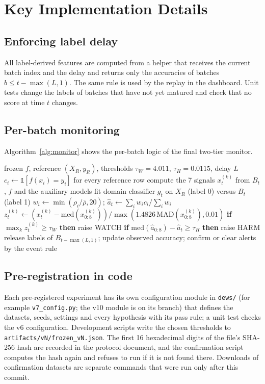\section{Key Implementation Details}
\subsection{Enforcing label delay}
All label-derived features are computed from a helper that receives the current batch index and the delay and returns only the accuracies of batches $b \le t-\max(L,1)$. The same rule is used by the replay in the dashboard. Unit tests change the labels of batches that have not yet matured and check that no score at time $t$ changes.

\subsection{Per-batch monitoring}
Algorithm~\ref{alg:monitor} shows the per-batch logic of the final two-tier monitor.

\begin{algorithm}[H]
\caption{Two-tier monitoring of one stream}
\label{alg:monitor}
\begin{algorithmic}[1]
\Require frozen $f$, reference $(X_R, y_R)$, thresholds $\tau_W=4.011$, $\tau_H=0.0115$, delay $L$
\State $c_i \gets \mathbb{1}[f(x_i)=y_i]$ for every reference row
  \State compute the 7 signals $x_t^{(k)}$ from $B_t$, $f$ and the auxiliary models
  \State fit domain classifier $g_t$ on $X_R$ (label 0) versus $B_t$ (label 1)
  \State $w_i \gets \min(\rho_i/\bar\rho, 20)$; \quad $\hat a_t \gets \sum_i w_i c_i / \sum_i w_i$
    \State $z^{(k)}_t \gets (x^{(k)}_t - \mathrm{med}(x^{(k)}_{0:8})) / \max(1.4826\,\mathrm{MAD}(x^{(k)}_{0:8}), 0.01)$
    \State \textbf{if} $\max_k z^{(k)}_t \geq \tau_W$ \textbf{then} raise WATCH
    \State \textbf{if} $\mathrm{med}(\hat a_{0:8}) - \hat a_t \geq \tau_H$ \textbf{then} raise HARM
  \EndIf
  \State release labels of $B_{t-\max(L,1)}$; update observed accuracy; confirm or clear alerts by the event rule
\EndFor
\end{algorithmic}
\end{algorithm}

\subsection{Pre-registration in code}
Each pre-registered experiment has its own configuration module in \texttt{dews/} (for example \texttt{v7\_config.py}; the v10 module is on its branch) that defines the datasets, seeds, settings and every hypothesis with its pass rule; a unit test checks the v6 configuration. Development scripts write the chosen thresholds to \texttt{artifacts/vN/frozen\_vN.json}. The first 16 hexadecimal digits of the file's SHA-256 hash are recorded in the protocol document, and the confirmation script computes the hash again and refuses to run if it is not found there. Downloads of confirmation datasets are separate commands that were run only after this commit.

